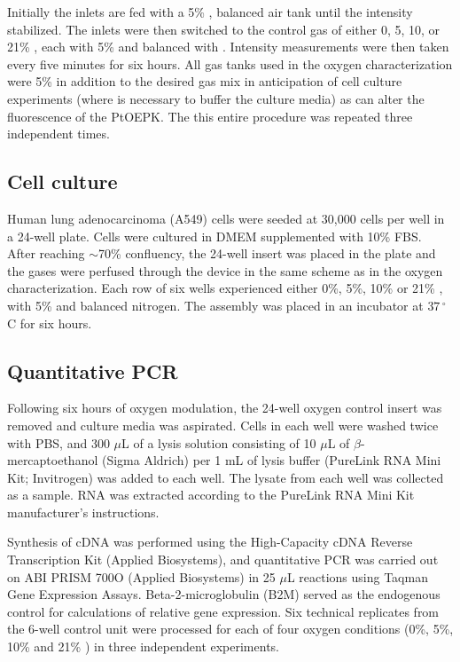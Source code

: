 \documentclass[10pt,letterpaper]{article}
\begin{document}
Initially the inlets are fed with a 5\% , balanced air tank until the intensity stabilized.
The inlets were then switched to the control gas of either 0, 5, 10, or 21\% , each with 5\%  and balanced with .
Intensity measurements were then taken every five minutes for six hours.
All gas tanks used in the oxygen characterization were 5\%   in addition to the desired gas mix in anticipation of cell culture experiments (where  is necessary to buffer the culture media) as  can alter the fluorescence of the PtOEPK.
The this entire procedure was repeated three independent times. 

\subsection*{Cell culture}

Human lung adenocarcinoma (A549) cells were seeded at 30,000 cells per well in a 24-well plate.
Cells were cultured in DMEM supplemented with 10\% FBS.
After reaching $\sim$70\% confluency, the 24-well insert was placed in the plate and the gases were perfused through the device in the same scheme as in the oxygen characterization.
Each row of six wells experienced either 0\%, 5\%, 10\% or 21\% , with 5\%  and balanced nitrogen.
The assembly was placed in an incubator at $37\,^{\circ}$C for six hours. 


\subsection*{Quantitative PCR}

Following six hours of oxygen modulation, the 24-well oxygen control insert was removed and culture media was aspirated.
Cells in each well were washed twice with PBS, and 300 $\mu$L of a lysis solution consisting of 10 $\mu$L of $\beta$-mercaptoethanol (Sigma Aldrich) per 1 mL of lysis buffer (PureLink RNA Mini Kit; Invitrogen) was added to each well.
The lysate from each well was collected as a sample.
RNA was extracted according to the PureLink RNA Mini Kit manufacturer’s instructions.

Synthesis of cDNA was performed using the High-Capacity cDNA Reverse Transcription Kit (Applied Biosystems), and quantitative PCR was carried out on ABI PRISM 700O (Applied Biosystems) in 25 $\mu$L reactions using Taqman Gene Expression Assays.
Beta-2-microglobulin (B2M) served as the endogenous control for calculations of relative gene expression.
Six technical replicates from the 6-well control unit were processed for each of four oxygen conditions (0\%, 5\%, 10\% and 21\% ) in three independent experiments.
\end{document}
